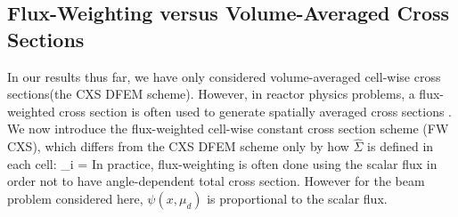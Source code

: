%
%
\subsection{Flux-Weighting versus Volume-Averaged Cross Sections}

In our results thus far, we have only considered volume-averaged cell-wise cross sections(the CXS DFEM scheme).
However, in reactor physics problems, a flux-weighted cross section is often used to generate spatially averaged cross sections \cite{bell_glasstone}.
We now introduce the flux-weighted cell-wise constant cross section scheme (FW CXS), which differs from the CXS DFEM scheme only by how $\hat{\Sigma}$ is defined in each cell: 
\benum
\hat{\Sigma}_i =  \pep
\label{eq:chap3_fw_cxs}
\eenum
In practice, flux-weighting is often done using the scalar flux in order not to have angle-dependent total cross section.  However for the beam problem considered here, $\psi(x,\mu_d)$ is proportional to the scalar flux.

